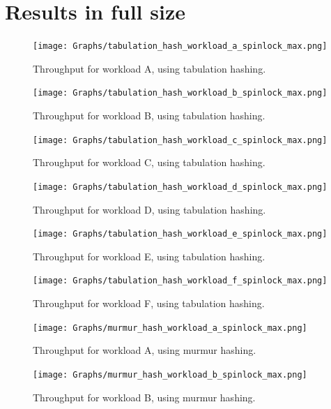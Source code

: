 \documentclass[11pt]{article} %
\begin{document}
\section{Results in full size}
\label{appendix:full_result_overview}
\begin{figure}[H]
  \centering
  \texttt{[image: Graphs/tabulation\_hash\_workload\_a\_spinlock\_max.png]}\\
  \caption[]{Throughput for workload A, using tabulation hashing.}\label{fig:tab_a_full}
\end{figure}
\begin{figure}[H]
  \centering
  \texttt{[image: Graphs/tabulation\_hash\_workload\_b\_spinlock\_max.png]}\\
  \caption[]{Throughput for workload B, using tabulation hashing.}\label{fig:tab_b_full}
\end{figure}
\begin{figure}[H]
  \centering
  \texttt{[image: Graphs/tabulation\_hash\_workload\_c\_spinlock\_max.png]}\\
  \caption[]{Throughput for workload C, using tabulation hashing.}\label{fig:tab_c_full}
\end{figure}
\begin{figure}[H]
  \centering
  \texttt{[image: Graphs/tabulation\_hash\_workload\_d\_spinlock\_max.png]}\\
  \caption[]{Throughput for workload D, using tabulation hashing.}\label{fig:tab_d_full}
\end{figure}
\begin{figure}[H]
  \centering
  \texttt{[image: Graphs/tabulation\_hash\_workload\_e\_spinlock\_max.png]}\\
  \caption[]{Throughput for workload E, using tabulation hashing.}\label{fig:tab_e_full}
\end{figure}
\begin{figure}[H]
  \centering
  \texttt{[image: Graphs/tabulation\_hash\_workload\_f\_spinlock\_max.png]}\\
  \caption[]{Throughput for workload F, using tabulation hashing.}\label{fig:tab_f_full}
\end{figure}
\begin{figure}[H]
  \centering
  \texttt{[image: Graphs/murmur\_hash\_workload\_a\_spinlock\_max.png]}\\
  \caption[]{Throughput for workload A, using murmur hashing.}\label{fig:mur_a_full}
\end{figure}
\begin{figure}[H]
  \centering
  \texttt{[image: Graphs/murmur\_hash\_workload\_b\_spinlock\_max.png]}\\
  \caption[]{Throughput for workload B, using murmur hashing.}\label{fig:mur_b_full}
\end{figure}
\end{document}
